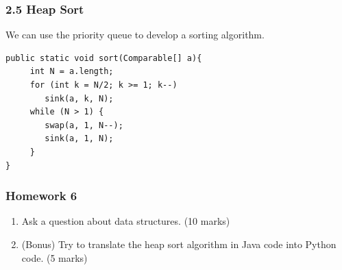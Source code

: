 \documentclass[aspectratio=169, 14pt]{beamer}
\begin{document}
\begin{frame}[fragile]
    \frametitle{2.5 Heap Sort}
We can use the priority queue to develop a sorting algorithm.

\begin{verbatim}
public static void sort(Comparable[] a){
     int N = a.length;
     for (int k = N/2; k >= 1; k--)
        sink(a, k, N);
     while (N > 1) {
        swap(a, 1, N--);
        sink(a, 1, N);
     }
}
\end{verbatim} 
\end{frame}

\begin{frame}
    \frametitle{Homework 6}
\begin{enumerate}
    \item Ask a question about data structures. (10 marks)
    \item (Bonus) Try to translate the heap sort algorithm in Java code into Python code. (5 marks)  
\end{enumerate}
\end{frame}
\end{document}

